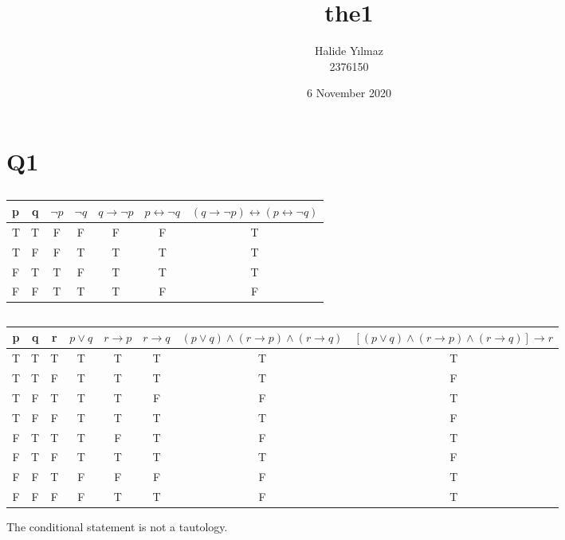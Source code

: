 \documentclass{article}
\title{the1}
\author{Halide Yılmaz \\ 2376150}
\date{6 November 2020}
\begin{document}
\maketitle

\section{Q1}
\subsection{}
\begin{tabular}{|l|c|c|c|c|c|c|}
    \hline
     p & q & $ \neg p $ & $\neg q $ & $ q\rightarrow \neg p $ & $ p \leftrightarrow \neg q $ & $ (q\rightarrow \neg p)   \leftrightarrow (p \leftrightarrow \neg q ) $ \\
    \hline \hline
    T&T&F&F&F&F&T \\
    \hline
    T&F&F&T&T&T&T \\
    \hline
    F&T&T&F&T&T&T\\
    \hline
    F&F&T&T&T&F&F\\ \hline
\end{tabular}
\subsection{}
\begin{tabular}{|c|c|c|c|c|c|c|c|}
     \hline
     p & q & r & $ p\lor q $ & $ r \rightarrow p $ & $ r \rightarrow q $ & $ (p\lor q )\land (r \rightarrow p) \land  (r \rightarrow q) $ & $ [(p\lor q )\land (r \rightarrow p) \land  (r \rightarrow q) ] \rightarrow r $ \\ 
     \hline \hline
     T&T&T&T&T&T&T&T \\
     \hline
     T&T&F&T&T&T&T&F \\
     \hline
     T&F&T&T&T&F&F&T \\
     \hline
     T&F&F&T&T&T&T&F \\
     \hline
     F&T&T&T&F&T&F&T \\
     \hline
     F&T&F&T&T&T&T&F \\
     \hline
     F&F&T&F&F&F&F&T \\
     \hline
     F&F&F&F&T&T&F&T \\
     \hline
\end{tabular}

The conditional statement is not a tautology.
\end{document}
